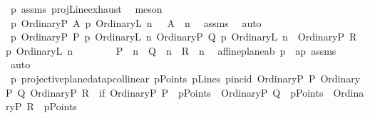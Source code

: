 \begin{isabellebody}
\ p{}\ assms{\isacharparenleft}{\kern0pt}{}{\isacharparenright}{\kern0pt}\ projLine{\isachardot}{\kern0pt}exhaust\ \isamarkupfalse%
\ meson\ \isanewline
\ \ \isamarkupfalse%
\ p{}{\isacharcolon}{\kern0pt}\ {\isachardoublequoteopen}{\isacharparenleft}{\kern0pt}{\isacharparenleft}{\kern0pt}OrdinaryP\ A{\isacharparenright}{\kern0pt}\ p{\isasymlhd}\ {\isacharparenleft}{\kern0pt}OrdinaryL\ n{\isacharparenright}{\kern0pt}{\isacharparenright}{\kern0pt}\ {\isasymLongrightarrow}\ \ A\ {\isasymlhd}\ n{\isachardoublequoteclose}\ \isamarkupfalse%
\ assms{\isacharparenleft}{\kern0pt}{}{\isacharparenright}{\kern0pt}\ \isamarkupfalse%
\ auto\isanewline
\ \ \isamarkupfalse%
\ p{}{\isacharcolon}{\kern0pt}\ {\isachardoublequoteopen}{\isacharparenleft}{\kern0pt}{\isacharparenleft}{\kern0pt}{\isacharparenleft}{\kern0pt}OrdinaryP\ P{\isacharparenright}{\kern0pt}\ p{\isasymlhd}\ {\isacharparenleft}{\kern0pt}OrdinaryL\ n{\isacharparenright}{\kern0pt}{\isacharparenright}{\kern0pt}{\isasymand}\ {\isacharparenleft}{\kern0pt}{\isacharparenleft}{\kern0pt}OrdinaryP\ Q{\isacharparenright}{\kern0pt}\ p{\isasymlhd}\ {\isacharparenleft}{\kern0pt}OrdinaryL\ n{\isacharparenright}{\kern0pt}{\isacharparenright}{\kern0pt}\ {\isasymand}\ {\isacharparenleft}{\kern0pt}{\isacharparenleft}{\kern0pt}OrdinaryP\ R{\isacharparenright}{\kern0pt}\ p{\isasymlhd}\ {\isacharparenleft}{\kern0pt}OrdinaryL\ n{\isacharparenright}{\kern0pt}{\isacharparenright}{\kern0pt}\ {\isacharparenright}{\kern0pt}\ {\isasymLongrightarrow}\ \ \isanewline
\ \ \ \ {\isacharparenleft}{\kern0pt}P\ {\isasymlhd}\ n{\isacharparenright}{\kern0pt}\ {\isasymand}\ {\isacharparenleft}{\kern0pt}Q\ {\isasymlhd}\ n{\isacharparenright}{\kern0pt}\ {\isasymand}\ {\isacharparenleft}{\kern0pt}R\ {\isasymlhd}\ n{\isacharparenright}{\kern0pt}{\isachardoublequoteclose}\ \isamarkupfalse%
\ affine{\isacharunderscore}{\kern0pt}plane{\isachardot}{\kern0pt}a{}b\ p{}\ \ ap\ assms{\isacharparenleft}{\kern0pt}{}{\isacharparenright}{\kern0pt}\ \isamarkupfalse%
\ auto\ \isanewline
\isanewline
\ \ \isamarkupfalse%
\ p{}{\isacharcolon}{\kern0pt}\ {\isachardoublequoteopen}{\isacharparenleft}{\kern0pt}projective{\isacharunderscore}{\kern0pt}plane{\isacharunderscore}{\kern0pt}data{}{\isachardot}{\kern0pt}pcollinear\ pPoints\ pLines\ pincid\ {\isacharparenleft}{\kern0pt}OrdinaryP\ P{\isacharparenright}{\kern0pt}\ {\isacharparenleft}{\kern0pt}OrdinaryP\ Q{\isacharparenright}{\kern0pt}\ {\isacharparenleft}{\kern0pt}OrdinaryP\ R{\isacharparenright}{\kern0pt}{\isacharparenright}{\kern0pt}\ {\isasymLongrightarrow}\ {\isacharparenleft}{\kern0pt}if\ {\isacharparenleft}{\kern0pt}{\isacharparenleft}{\kern0pt}OrdinaryP\ P{\isacharparenright}{\kern0pt}\ {\isasymin}\ pPoints\ {\isasymand}\ {\isacharparenleft}{\kern0pt}OrdinaryP\ Q{\isacharparenright}{\kern0pt}\ {\isasymin}\ pPoints\ {\isasymand}\ {\isacharparenleft}{\kern0pt}OrdinaryP\ R{\isacharparenright}{\kern0pt}\ {\isasymin}\ pPoints{\isacharparenright}{\kern0pt}\ \isanewline

\end{isabellebody}
